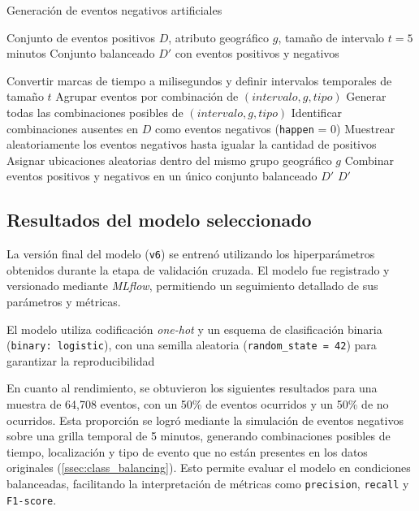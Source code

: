 \documentclass[12pt]{article}
\begin{document}
\begin{algorithm}[H]
\caption{Generación de eventos negativos artificiales}
\label{alg:neg_events}
\begin{algorithmic}[1]
\Require Conjunto de eventos positivos $D$, atributo geográfico $g$, tamaño de intervalo $t = 5$ minutos
\Ensure Conjunto balanceado $D'$ con eventos positivos y negativos

\State Convertir marcas de tiempo a milisegundos y definir intervalos temporales de tamaño $t$
\State Agrupar eventos por combinación de $(intervalo, g, tipo)$
\State Generar todas las combinaciones posibles de $(intervalo, g, tipo)$
\State Identificar combinaciones ausentes en $D$ como eventos negativos (\texttt{happen} = 0)
\State Muestrear aleatoriamente los eventos negativos hasta igualar la cantidad de positivos
\State Asignar ubicaciones aleatorias dentro del mismo grupo geográfico $g$
\State Combinar eventos positivos y negativos en un único conjunto balanceado $D'$
\State \Return $D'$
\end{algorithmic}
\end{algorithm}

\subsection{Resultados del modelo seleccionado}

La versión final del modelo (\texttt{v6}) se entrenó utilizando los hiperparámetros obtenidos durante la etapa de validación cruzada. El modelo fue registrado y versionado mediante \textit{MLflow}, permitiendo un seguimiento detallado de sus parámetros y métricas.

El modelo utiliza codificación \textit{one-hot} y un esquema de clasificación binaria (\texttt{binary: logistic}), con una semilla aleatoria (\texttt{random\_state = 42}) para garantizar la reproducibilidad \citep{geron2019hands}


\noindent En cuanto al rendimiento, se obtuvieron los siguientes resultados para una muestra de 64,708 eventos, con un 50\% de eventos ocurridos y un 50\% de no ocurridos. Esta proporción se logró mediante la simulación de eventos negativos sobre una grilla temporal de 5 minutos, generando combinaciones posibles de tiempo, localización y tipo de evento que no están presentes en los datos originales (\cref{ssec:class_balancing}). Esto permite evaluar el modelo en condiciones balanceadas, facilitando la interpretación de métricas como \texttt{precision}, \texttt{recall} y \texttt{F1-score}.
\end{document}
